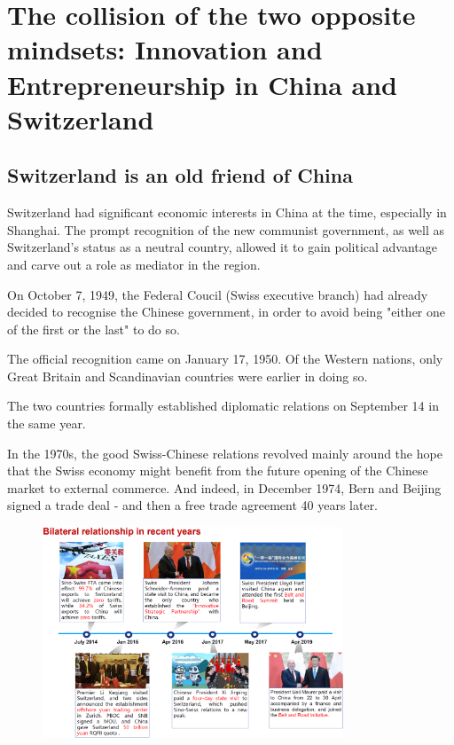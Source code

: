 \section{The collision of the two opposite mindsets: Innovation and Entrepreneurship
in China and Switzerland}

\subsection{Switzerland is an old friend of China}

Switzerland had significant economic interests in China at the time, especially
in Shanghai. The prompt recognition of the new communist government, as well
as Switzerland's status as a neutral country, allowed it to gain political
advantage and carve out a role as mediator in the region.

On October 7, 1949, the Federal Coucil (Swiss executive branch) had already
decided to recognise the Chinese government, in order to avoid being "either
one of the first or the last" to do so.

The official recognition came on January 17, 1950. Of the Western nations,
only Great Britain and Scandinavian countries were earlier in doing so.

The two countries formally established diplomatic relations on September
14 in the same year.

\vspace{1\baselineskip}

In the 1970s, the good Swiss-Chinese relations revolved mainly around the hope
that the Swiss economy might benefit from the future opening of the Chinese
market to external commerce. And indeed, in December 1974, Bern and Beijing
signed a trade deal - and then a free trade agreement 40 years later.

\begin{figure}[h]
    \centering
    \includegraphics[width=0.8\textwidth]{Pictures/bilateral_china_switzerland.png}
\end{figure}

